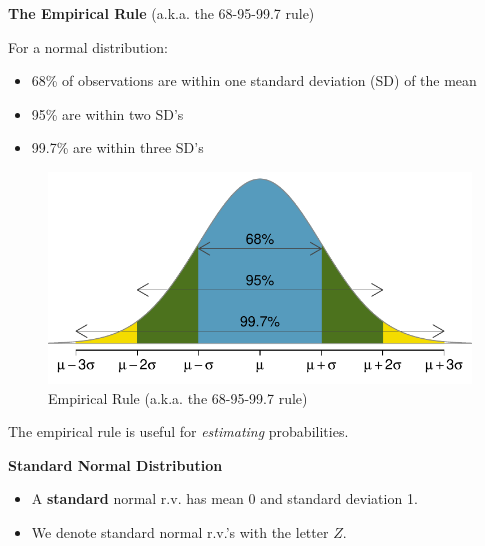 \documentclass[12pt]{amsart}
\newcommand{\m}{\mu}
\newcommand{\s}{\sigma}
\newcommand{\bP}{\mathbb{P}}
\begin{document}
{\newpage

\textbf{The Empirical Rule} (a.k.a. the 68-95-99.7 rule) \newline

For a normal distribution: 
\begin{itemize}
\item 68\% of observations are within one standard deviation (SD) of the mean
\item 95\% are within two SD’s
\item 99.7\% are within three SD’s
\end{itemize}


\begin{figure}[h!]
  \includegraphics[width=5in]{img/6895997.pdf}
  \caption{Empirical Rule (a.k.a. the 68-95-99.7 rule)}
  \label{fig:normal}
\end{figure}


The empirical rule is useful for \textit{estimating} probabilities.

\vspace{1cm}

\textbf{Standard Normal Distribution} \newline

\begin{itemize}
\item A \textbf{standard} normal r.v. has mean 0 and standard deviation 1.
\item We denote standard normal r.v.'s with the letter $Z$.
\end{itemize}

%
%
%



}
\end{document}
